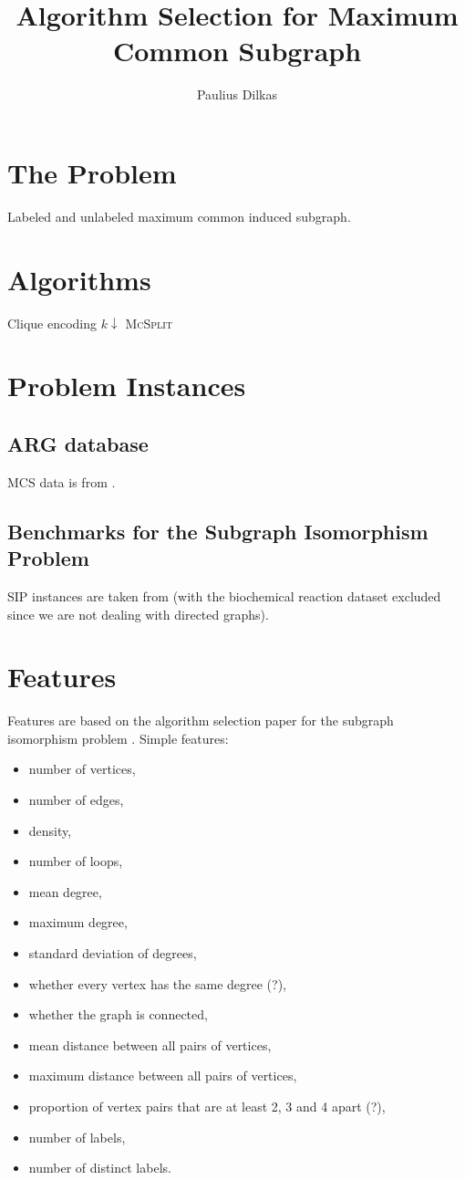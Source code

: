 \documentclass{article}
\author{Paulius Dilkas}
\title{Algorithm Selection for Maximum Common Subgraph}
\begin{document}
\maketitle

\section{The Problem}
Labeled and unlabeled maximum common induced subgraph.

\section{Algorithms}
Clique encoding \cite{DBLP:conf/cp/McCreeshNPS16}
$k\downarrow$ \cite{DBLP:conf/aaai/HoffmannMR17}
\textsc{McSplit} \cite{DBLP:conf/ijcai/McCreeshPT17}

\section{Problem Instances}

\subsection{ARG database}
MCS data is from \cite{DeSanto2003}\cite{foggia2001-2}.

\subsection{Benchmarks for the Subgraph Isomorphism Problem}
SIP instances are taken from \cite{solnon} (with the biochemical reaction
dataset excluded since we are not dealing with directed graphs).

\section{Features}
Features are based on the algorithm selection paper for the subgraph isomorphism
problem \cite{DBLP:conf/lion/KotthoffMS16}. Simple features:

\begin{itemize}
\item number of vertices,
\item number of edges,
\item density,
\item number of loops,
\item mean degree,
\item maximum degree,
\item standard deviation of degrees,
\item whether every vertex has the same degree (?),
\item whether the graph is connected,
\item mean distance between all pairs of vertices,
\item maximum distance between all pairs of vertices,
\item proportion of vertex pairs that are at least 2, 3 and 4 apart (?),
\item number of labels,
\item number of distinct labels.
\end{itemize}
\end{document}
